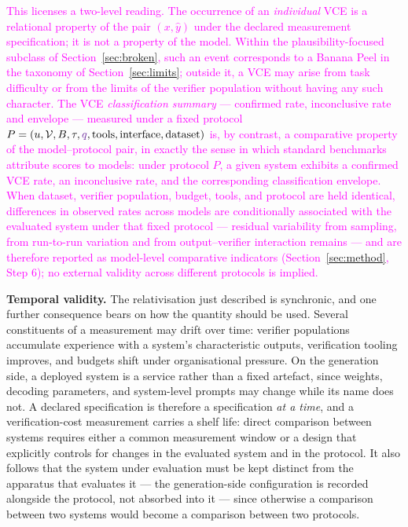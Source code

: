 \documentclass[11pt]{article}
\newcommand{\rev}[1]{\textcolor{magenta}{#1}}
\newcommand{\drift}[1]{\textcolor{cyan!85!black}{#1}}
\newcommand{\bridge}[1]{\textcolor[HTML]{ED7D31}{#1}}
\newcommand{\viola}[1]{\textcolor[HTML]{7030A0}{#1}}
\newcommand{\rev}[1]{#1}
\newcommand{\drift}[1]{#1}
\newcommand{\bridge}[1]{#1}
\newcommand{\viola}[1]{#1}
\begin{document}
\rev{This licenses a two-level reading. The occurrence of an \emph{individual} VCE is a relational property of the pair $(x,\hat{y})$ under the declared measurement specification; it is not a property of the model. \viola{Within the plausibility-focused subclass of Section~\ref{sec:broken}, such an event corresponds to a Banana Peel in the taxonomy of Section~\ref{sec:limits}; outside it, a VCE may arise from task difficulty or from the limits of the verifier population without having any such character.} \viola{The VCE \emph{classification summary} --- confirmed rate, inconclusive rate and envelope --- measured under a fixed protocol} $P=(u,\mathcal{V},B,\tau,\viola{q},\text{tools},\text{interface},\text{dataset})$ is, by contrast, a comparative property of the model--protocol pair, in exactly the sense in which standard benchmarks attribute scores to models: under protocol $P$, \bridge{a given system} exhibits \viola{a confirmed VCE rate, an inconclusive rate, and the corresponding classification envelope}. When dataset, verifier population, budget, tools, and protocol are held identical, differences in observed rates across models \viola{are conditionally associated with the evaluated system under that fixed protocol --- residual variability from sampling, from run-to-run variation and from output--verifier interaction remains --- and are therefore reported as model-level comparative indicators} (Section~\ref{sec:method}, Step 6); no external validity across different protocols is implied.}

\drift{\textbf{Temporal validity.} The relativisation just described is synchronic, and one further consequence bears on how the quantity should be used. Several constituents of a measurement may drift over time: verifier populations accumulate experience with a system's characteristic outputs, verification tooling improves, and budgets shift under organisational pressure. On the generation side, a deployed system is a service rather than a fixed artefact, since weights, decoding parameters, and system-level prompts may change while its name does not. A declared specification is therefore a specification \emph{at a time}, and a verification-cost measurement carries a shelf life: direct comparison between systems requires either a common measurement window or a design that explicitly controls for changes in the evaluated system and in the protocol. It also follows that the system under evaluation must be kept distinct from the apparatus that evaluates it --- the generation-side configuration is recorded alongside the protocol, not absorbed into it --- since otherwise a comparison between two systems would become a comparison between two protocols.}
\end{document}
